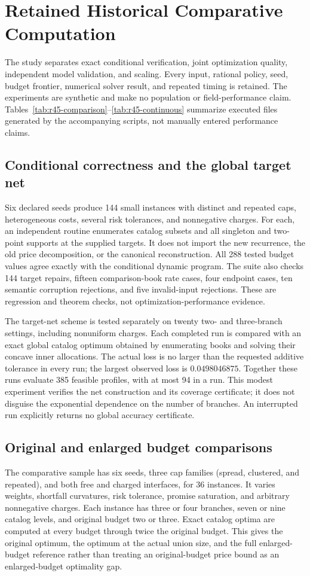 \section{Retained Historical Comparative Computation}\label{sec:r45-study}
The study separates exact conditional verification, joint optimization quality, independent model validation, and scaling. Every input, rational policy, seed, budget frontier, numerical solver result, and repeated timing is retained. The experiments are synthetic and make no population or field-performance claim. Tables~\ref{tab:r45-comparison}--\ref{tab:r45-continuous} summarize executed files generated by the accompanying scripts, not manually entered performance claims.

\subsection{Conditional correctness and the global target net}
Six declared seeds produce 144 small instances with distinct and repeated caps, heterogeneous costs, several risk tolerances, and nonnegative charges. For each, an independent routine enumerates catalog subsets and all singleton and two-point supports at the supplied targets. It does not import the new recurrence, the old price decomposition, or the canonical reconstruction. All 288 tested budget values agree exactly with the conditional dynamic program. The suite also checks 144 target repairs, fifteen comparison-book rate cases, four endpoint cases, ten semantic corruption rejections, and five invalid-input rejections. These are regression and theorem checks, not optimization-performance evidence.

The target-net scheme is tested separately on twenty two- and three-branch settings, including nonuniform charges. Each completed run is compared with an exact global catalog optimum obtained by enumerating books and solving their concave inner allocations. The actual loss is no larger than the requested additive tolerance in every run; the largest observed loss is $0.0498046875$. Together these runs evaluate 385 feasible profiles, with at most 94 in a run. This modest experiment verifies the net construction and its coverage certificate; it does not disguise the exponential dependence on the number of branches. An interrupted run explicitly returns no global accuracy certificate.

\subsection{Original and enlarged budget comparisons}
The comparative sample has six seeds, three cap families (spread, clustered, and repeated), and both free and charged interfaces, for 36 instances. It varies weights, shortfall curvatures, risk tolerance, promise saturation, and arbitrary nonnegative charges. Each instance has three or four branches, seven or nine catalog levels, and original budget two or three. Exact catalog optima are computed at every budget through twice the original budget. This gives the original optimum, the optimum at the actual union size, and the full enlarged-budget reference rather than treating an original-budget price bound as an enlarged-budget optimality gap.

